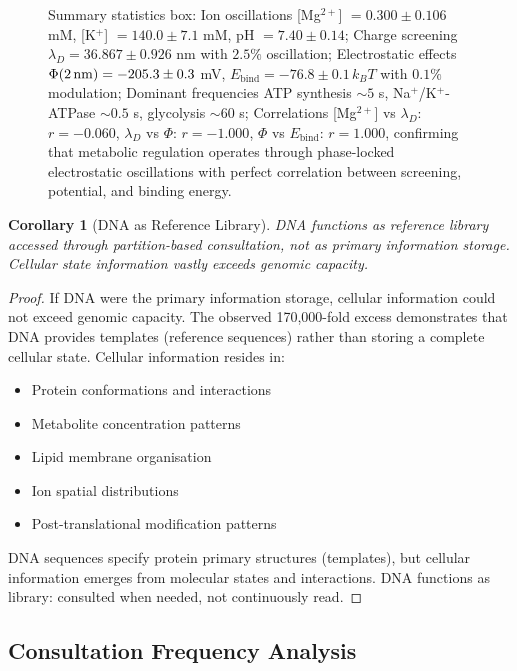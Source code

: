 \documentclass[11pt,a4paper]{article}
\newtheorem{corollary}[theorem]{Corollary}
\theoremstyle{remark}
\begin{document}
\begin{figure}[htbp]
{Summary statistics box: Ion oscillations [Mg$^{2+}$] $= 0.300 \pm 0.106$ mM, [K$^+$] $= 140.0 \pm 7.1$ mM, pH $= 7.40 \pm 0.14$; Charge screening $\lambda_D = 36.867 \pm 0.926$ nm with $2.5\%$ oscillation; Electrostatic effects $\Phi(2\,{\rm nm}) = -205.3 \pm 0.3$ mV, $E_{\text{bind}} = -76.8 \pm 0.1\, k_B T$ with $0.1\%$ modulation; Dominant frequencies ATP synthesis $\sim 5$ s, Na$^+$/K$^+$-ATPase $\sim 0.5$ s, glycolysis $\sim 60$ s; Correlations [Mg$^{2+}$] vs $\lambda_D$: $r = -0.060$, $\lambda_D$ vs $\Phi$: $r = -1.000$, $\Phi$ vs $E_{\text{bind}}$: $r = 1.000$, confirming that metabolic regulation operates through phase-locked electrostatic oscillations with perfect correlation between screening, potential, and binding energy.}
\label{fig:metabolic_oscillations}
\end{figure}

\begin{corollary}[DNA as Reference Library]
\label{cor:dna_reference}
DNA functions as reference library accessed through partition-based consultation, not as primary information storage. Cellular state information vastly exceeds genomic capacity.
\end{corollary}

\begin{proof}
If DNA were the primary information storage, cellular information could not exceed genomic capacity. The observed 170,000-fold excess demonstrates that DNA provides templates (reference sequences) rather than storing a complete cellular state. Cellular information resides in:
\begin{itemize}
\item Protein conformations and interactions
\item Metabolite concentration patterns
\item Lipid membrane organisation
\item Ion spatial distributions
\item Post-translational modification patterns
\end{itemize}
DNA sequences specify protein primary structures (templates), but cellular information emerges from molecular states and interactions. DNA functions as library: consulted when needed, not continuously read.
\end{proof}

\subsection{Consultation Frequency Analysis}
\end{document}
